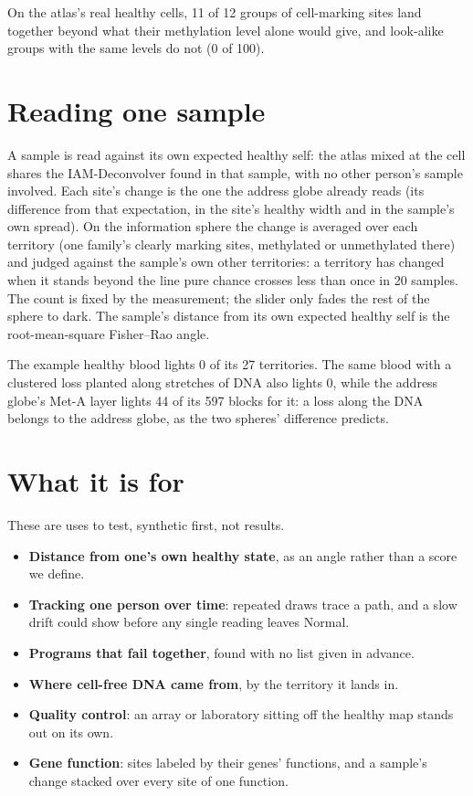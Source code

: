 On the atlas's real healthy cells, 11 of 12 groups of cell-marking sites land together beyond what their methylation level alone would
give, and look-alike groups with the same levels do not (0 of 100).

\section{Reading one sample}

A sample is read against its own expected healthy self: the atlas mixed at the cell shares the IAM-Deconvolver found in that sample, with
no other person's sample involved. Each site's change is the one the address globe already reads (its difference from that expectation,
in the site's healthy width and in the sample's own spread). On the information sphere the change is averaged over each territory (one
family's clearly marking sites, methylated or unmethylated there) and judged against the sample's own other territories: a territory has
changed when it stands beyond the line pure chance crosses less than once in 20 samples. The count is fixed by the measurement; the
slider only fades the rest of the sphere to dark. The sample's distance from its own expected healthy self is the root-mean-square
Fisher--Rao angle.

The example healthy blood lights 0 of its 27 territories. The same blood with a clustered loss planted along stretches of DNA also
lights 0, while the address globe's Met-A layer lights 44 of its 597 blocks for it: a loss along the DNA belongs to the address globe,
as the two spheres' difference predicts.

\section{What it is for}

These are uses to test, synthetic first, not results.
\begin{itemize}
\item \textbf{Distance from one's own healthy state}, as an angle rather than a score we define.
\item \textbf{Tracking one person over time}: repeated draws trace a path, and a slow drift could show before any single reading leaves
Normal.
\item \textbf{Programs that fail together}, found with no list given in advance.
\item \textbf{Where cell-free DNA came from}, by the territory it lands in.
\item \textbf{Quality control}: an array or laboratory sitting off the healthy map stands out on its own.
\item \textbf{Gene function}: sites labeled by their genes' functions, and a sample's change stacked over every site of one function.
\end{itemize}

